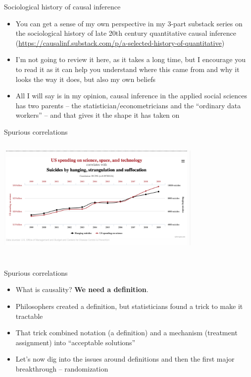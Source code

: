\documentclass{beamer}
\begin{document}
\begin{frame}{Sociological history of causal inference}

\begin{itemize}

\item You can get a sense of my own perspective in my 3-part substack series on the sociological history of late 20th century quantitative causal inference (\url{https://causalinf.substack.com/p/a-selected-history-of-quantitative})
\item I'm not going to review it here, as it takes a long time, but I encourage you to read it as it can help you understand where this came from and why it looks the way it does, but also my own beliefs
\item All I will say is in my opinion, causal inference in the applied social sciences has two parents -- the statistician/econometricians and the ``ordinary data workers'' -- and that gives it the shape it has taken on
\end{itemize}

\end{frame}


\begin{frame}{Spurious correlations}
  \centering
  \includegraphics[scale=0.5,height=6.5cm, width=10cm]{./lecture_includes/spurious_correlation}
\end{frame}

\begin{frame}{Spurious correlations}

\begin{itemize}

\item What is causality?  \textbf{We need a definition}.
\item Philosophers created a definition, but statisticians found a trick to make it tractable
\item That trick combined notation (a definition) and a mechanism (treatment assignment) into ``acceptable solutions''
\item Let's now dig into the issues around definitions and then the first major breakthrough -- randomization

\end{itemize}

\end{frame}
\end{document}
